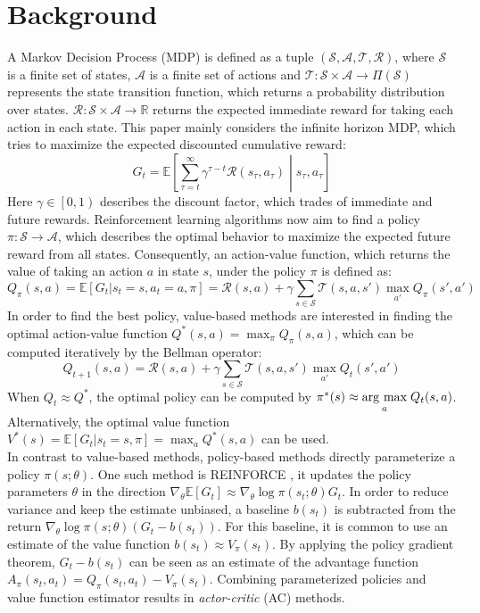     \section{Background\label{sec:background}}
    A Markov Decision Process (MDP) is defined as a tuple $(\mathcal{S}, \mathcal{A}, \mathcal{T},\mathcal{R})$, where $\mathcal{S}$ is a finite set of states, $\mathcal{A}$ is a finite set of actions and $\mathcal{T}:\mathcal{S} \times \mathcal{A} \rightarrow \Pi(\mathcal{S})$ represents the state transition function, which returns a probability distribution over states.
    $\mathcal{R}:\mathcal{S} \times \mathcal{A} \rightarrow \mathbb{R}$ returns the expected immediate reward for taking each action in each state. 
    This paper mainly considers the infinite horizon MDP, which tries to maximize the expected discounted cumulative reward:
    \[
    G_t = \mathbb{E} \left[ \sum_{\tau=t}^{\infty} \gamma^{\tau-t} \mathcal{R}(s_\tau,a_\tau)\middle|s_\tau,a_\tau \right]
	\]
    Here $\gamma \in \left[0,1\right)$ describes the discount factor, which trades of immediate and future rewards.
    Reinforcement learning algorithms now aim to find a policy $\pi:\mathcal{S} \rightarrow \mathcal{A}$, which describes the optimal behavior to maximize the expected future reward from all states.
    Consequently, an action-value function, which returns the value of taking an action $a$ in state $s$, under the policy $\pi$ is defined as:
    \[
    Q_\pi(s,a) = \mathbb{E}\left[G_t|s_t =s,a_t=a,\pi\right] = \mathcal{R}(s,a) + \gamma \sum_{s\in\mathcal{S}}\mathcal{T}(s,a,s') \max_{a'}Q_\pi(s',a')
	\]
    In order to find the best policy, value-based methods are interested in finding the optimal action-value function $Q^*(s,a) =\max_\pi Q_\pi(s,a)$, which can be computed iteratively by the Bellman operator:
    \[
	 Q_{t+1}(s,a) = \mathcal{R}(s,a) + \gamma \sum_{s\in\mathcal{S}}\mathcal{T}(s,a,s') \max_{a'}Q_t(s',a')
    \]
    When $Q_t \approx Q^*$, the optimal policy can be computed by $\pi^*(s) \approx \underset{a}{\operatorname{arg}\,\operatorname{max}}\; Q_t(s,a)$.
    Alternatively, the optimal value function $V^*(s) = \mathbb{E}\left[G_t|s_t=s, \pi\right] = \max_{a} Q^*(s,a)$ can be used.\\
    In contrast to value-based methods, policy-based methods directly parameterize a policy $\pi(s;\theta)$. 
    One such method is REINFORCE \cite{Williams1992}, it updates the policy parameters $\theta$ in the direction $\nabla_\theta \mathbb{E}[G_t]\approx \nabla_\theta\log\pi(s_t;\theta)G_t$.
    In order to reduce variance and keep the estimate unbiased, a baseline $b(s_t)$ is subtracted from the return $\nabla_\theta\log\pi(s;\theta)(G_t - b(s_t))$. 
    For this baseline, it is common to use an estimate of the value function $b(s_t)\approx V_\pi(s_t)$.
    By applying the policy gradient theorem, $G_t-b(s_t)$ can be seen as an estimate of the advantage function $A_\pi(s_t,a_t) = Q_\pi(s_t,a_t) - V_\pi(s_t)$.
    Combining parameterized policies and value function estimator results in \textit{actor-critic} (AC) methods. 
    
